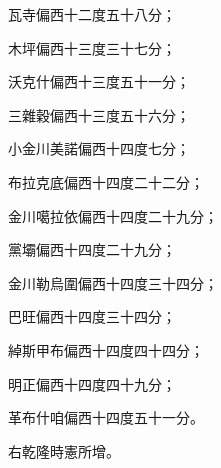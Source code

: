 \begin{pinyinscope}
瓦寺偏西十二度五十八分；

木坪偏西十三度三十七分；

沃克什偏西十三度五十一分；

三雜穀偏西十三度五十六分；

小金川美諾偏西十四度七分；

布拉克底偏西十四度二十二分；

金川噶拉依偏西十四度二十九分；

黨壩偏西十四度二十九分；

金川勒烏圍偏西十四度三十四分；

巴旺偏西十四度三十四分；

綽斯甲布偏西十四度四十四分；

明正偏西十四度四十九分；

革布什咱偏西十四度五十一分。

右乾隆時憲所增。


\end{pinyinscope}